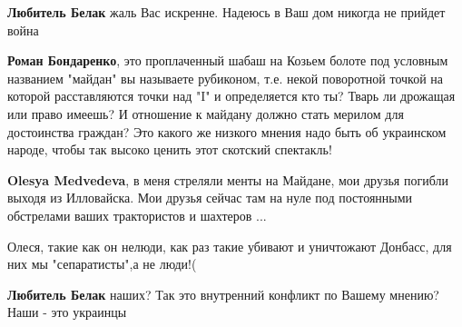 \begin{itemize}
\begin{itemize}
\textbf{Любитель Белак} жаль Вас искренне. Надеюсь в Ваш дом никогда не прийдет война

 
\textbf{Роман Бондаренко}, это проплаченный шабаш на Козьем болоте под условным
названием "майдан" вы называете рубиконом, т.е. некой поворотной точкой на
которой расставляются точки над "I" и определяется кто ты? Тварь ли дрожащая
или право имеешь? И отношение к майдану должно стать мерилом для достоинства
граждан? Это какого же низкого мнения надо быть об украинском народе, чтобы так
высоко ценить этот скотский спектакль!

 
\textbf{Olesya Medvedeva}, в меня стреляли менты на Майдане, мои друзья погибли
выходя из Илловайска. Мои друзья сейчас там на нуле под постоянными обстрелами
ваших трактористов и шахтеров ...

 
Олеся, такие как он нелюди, как раз такие убивают и уничтожают Донбасс, для них мы "сепаратисты",а не люди!(

 
\textbf{Любитель Белак} наших? Так это внутренний конфликт по Вашему мнению? Наши - это украинцы

 

\end{itemize}
\end{itemize}
